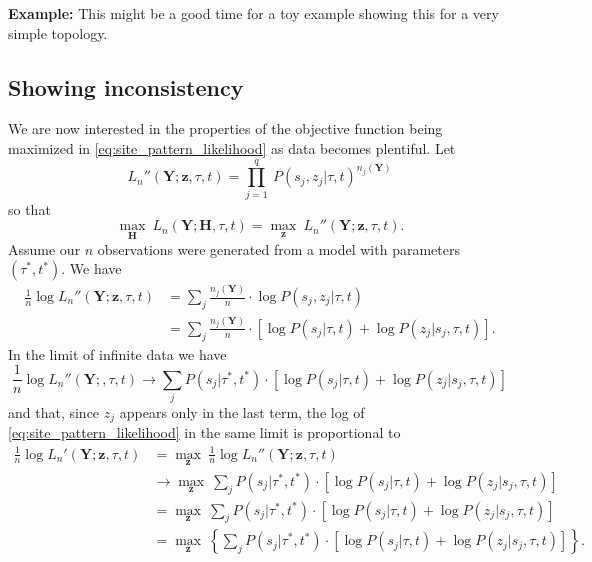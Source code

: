\documentclass[a4paper]{article}
\newcommand{\fullAlignment}{\mathbf{Y}}
\newcommand{\sitePattern}{s}
\newcommand{\fullAncestralStates}{\mathbf{H}}
\newcommand{\ancestralStateCategory}{z}
\newcommand{\fullAncestralStateCategories}{\mathbf{z}}
\begin{document}
\textbf{Example:} This might be a good time for a toy example showing this for a very simple topology.


\subsection{Showing inconsistency}

We are now interested in the properties of the objective function being maximized in \eqref{eq:site_pattern_likelihood} as data becomes plentiful.
Let
$$
L_n''(\fullAlignment;\fullAncestralStateCategories,\tau,t) = \prod_{j=1}^q \ P(\sitePattern_j, \ancestralStateCategory_j | \tau, t)^{n_j(\fullAlignment)}
$$
so that
$$
\max_{\fullAncestralStates} \ L_n(\fullAlignment;\fullAncestralStates, \tau, t) =
    \max_{\fullAncestralStateCategories} \ L_n''(\fullAlignment;\fullAncestralStateCategories,\tau,t).
$$
Assume our $n$ observations were generated from a model with parameters $(\tau^*, t^*)$.
We have
\begin{align}
    \frac{1}{n} \log L_n''(\fullAlignment;\fullAncestralStateCategories,\tau,t)
        &= \sum_{j} \frac{n_j(\fullAlignment)}{n}\cdot  \log P(\sitePattern_j, \ancestralStateCategory_j | \tau, t) \\
        &= \sum_{j} \frac{n_j(\fullAlignment)}{n}\cdot [\log P(\sitePattern_j | \tau, t) + \log P(\ancestralStateCategory_j | \sitePattern_j, \tau, t)].
\end{align}
In the limit of infinite data we have
$$
\frac{1}{n} \log L_n''(\fullAlignment;,\tau,t) \rightarrow \sum_{j} P(\sitePattern_j | \tau^*, t^*) \cdot [\log P(\sitePattern_j | \tau, t) + \log P(\ancestralStateCategory_j | \sitePattern_j, \tau, t)]
$$
and that, since $\ancestralStateCategory_j$ appears only in the last term, the log of \eqref{eq:site_pattern_likelihood} in the same limit is proportional to
\begin{align}
\frac{1}{n} \log L_n'(\fullAlignment;\fullAncestralStateCategories,\tau, t)
    &= \max_{\fullAncestralStateCategories} \ \frac{1}{n} \log L_n''(\fullAlignment;\fullAncestralStateCategories,\tau,t) \nonumber \\
    &\rightarrow \max_{\fullAncestralStateCategories} \ \sum_{j} P(\sitePattern_j | \tau^*, t^*) \cdot [\log P(\sitePattern_j | \tau, t) + \log P(\ancestralStateCategory_j | \sitePattern_j, \tau, t)] \nonumber \\
    &= \max_{\fullAncestralStateCategories} \ \sum_{j} P(\sitePattern_j | \tau^*, t^*) \cdot [\log P(\sitePattern_j | \tau, t) + \log P(\ancestralStateCategory_j | \sitePattern_j, \tau, t)] \nonumber \\
    &= \max_{\fullAncestralStateCategories} \ \left\{\sum_{j} P(\sitePattern_j | \tau^*, t^*) \cdot \left[\log P(\sitePattern_j | \tau, t) + \log P(\ancestralStateCategory_j | \sitePattern_j, \tau, t)\right]\right\}. \label{eq:site_pattern_profile_likelihood_mean}
\end{align}
\end{document}
